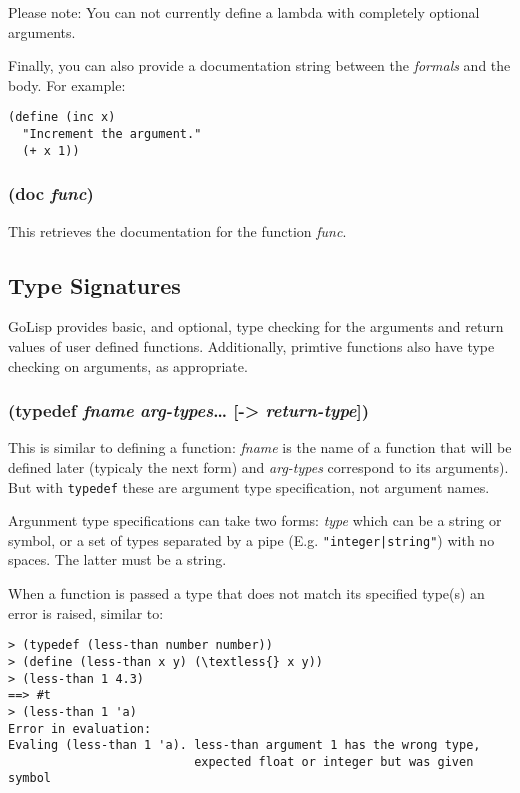 \documentclass{article}
\begin{document}
Please note: You can not currently define a lambda with completely optional arguments.

Finally, you can also provide a documentation string between the \emph{formals} and the body.
For example:

\begin{verbatim}
(define (inc x) 
  "Increment the argument." 
  (+ x 1))
\end{verbatim}

\subsubsection{(doc \emph{func})}
 
This retrieves the documentation for the function \emph{func}.

\subsection{Type Signatures}\label{sec:type-signatures}

GoLisp provides basic, and optional, type checking for the arguments and return values of user
defined functions. Additionally, primtive functions also have type checking on arguments, as
appropriate.

\subsubsection{(typedef \emph{fname} \emph{arg-types}\ldots{} [-\textgreater{} \emph{return-type}])}

This is similar to defining a function: \emph{fname} is the name of a function that will be
defined later (typicaly the next form) and \emph{arg-types} correspond to its arguments). But
with \verb|typedef| these are argument type specification, not argument names.

Argunment type specifications can take two forms: \emph{type} which can be a string or symbol,
or a set of types separated by a pipe (E.g. \verb?"integer|string"?) with no spaces. The
latter must be a string.

When a function is passed a type that does not match its specified type(s) an error is raised,
similar to:


\begin{verbatim}
> (typedef (less-than number number))
> (define (less-than x y) (\textless{} x y))
> (less-than 1 4.3)
==> #t
> (less-than 1 'a)
Error in evaluation: 
Evaling (less-than 1 'a). less-than argument 1 has the wrong type, 
                          expected float or integer but was given symbol
\end{verbatim}
\end{document}
